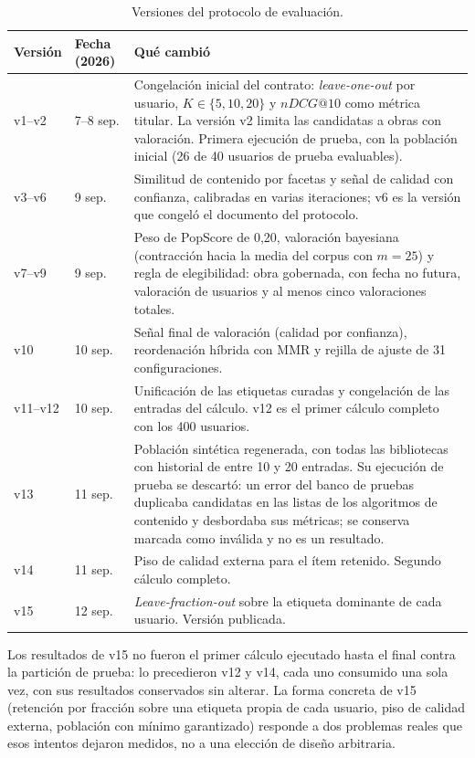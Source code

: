\begin{table}[htp]
\centering
\small
\begin{tabularx}{\textwidth}{ | C{0.13\textwidth} | C{0.13\textwidth} | Y | }
    \hline
    \textbf{Versión} & \textbf{Fecha (2026)} & \textbf{Qué cambió} \\
    \hline
    v1--v2 & 7--8 sep. & Congelación inicial del contrato: \emph{leave-one-out} por usuario, \(K \in \{5, 10, 20\}\) y \(nDCG@10\) como métrica titular. La versión v2 limita las candidatas a obras con valoración. Primera ejecución de prueba, con la población inicial (26 de 40 usuarios de prueba evaluables). \\
    \hline
    v3--v6 & 9 sep. & Similitud de contenido por facetas y señal de calidad con confianza, calibradas en varias iteraciones; v6 es la versión que congeló el documento del protocolo. \\
    \hline
    v7--v9 & 9 sep. & Peso de PopScore de 0,20, valoración bayesiana (contracción hacia la media del corpus con \(m = 25\)) y regla de elegibilidad: obra gobernada, con fecha no futura, valoración de usuarios y al menos cinco valoraciones totales. \\
    \hline
    v10 & 10 sep. & Señal final de valoración (calidad por confianza), reordenación híbrida con MMR y rejilla de ajuste de 31 configuraciones. \\
    \hline
    v11--v12 & 10 sep. & Unificación de las etiquetas curadas y congelación de las entradas del cálculo. v12 es el primer cálculo completo con los 400 usuarios. \\
    \hline
    v13 & 11 sep. & Población sintética regenerada, con todas las bibliotecas con historial de entre 10 y 20 entradas. Su ejecución de prueba se descartó: un error del banco de pruebas duplicaba candidatas en las listas de los algoritmos de contenido y desbordaba sus métricas; se conserva marcada como inválida y no es un resultado. \\
    \hline
    v14 & 11 sep. & Piso de calidad externa para el ítem retenido. Segundo cálculo completo. \\
    \hline
    v15 & 12 sep. & \emph{Leave-fraction-out} sobre la etiqueta dominante de cada usuario. Versión publicada. \\
    \hline
\end{tabularx}
\caption{Versiones del protocolo de evaluación.}
\label{tab:exp-versiones}
\end{table}

Los resultados de v15 no fueron el primer cálculo ejecutado hasta el final contra la partición de prueba: lo precedieron v12 y v14, cada uno consumido una sola vez, con sus resultados conservados sin alterar. La forma concreta de v15 (retención por fracción sobre una etiqueta propia de cada usuario, piso de calidad externa, población con mínimo garantizado) responde a dos problemas reales que esos intentos dejaron medidos, no a una elección de diseño arbitraria.

